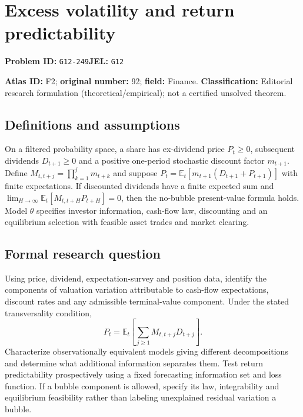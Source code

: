 \documentclass[11pt,a4paper]{article}
\begin{document}
\section*{Excess volatility and return predictability}
\textbf{Problem ID:} \texttt{G12-249}\quad \textbf{JEL:} \texttt{G12}\par
\label{problem:OP-0092}
\label{audited:ECON-037}
\label{atlas:prob:F2}

\noindent\textbf{Atlas ID:} F2; \textbf{original number:} 92; \textbf{field:} Finance. \textbf{Classification:} Editorial research formulation (theoretical/empirical); not a certified unsolved theorem.

\subsection*{Definitions and assumptions}
On a filtered probability space, a share has ex-dividend price $P_t\ge0$, subsequent dividends $D_{t+1}\ge0$ and a positive one-period stochastic discount factor $m_{t+1}$. Define $M_{t,t+j}=\prod_{k=1}^{j}m_{t+k}$ and suppose $P_t=\mathbb E_t[m_{t+1}(D_{t+1}+P_{t+1})]$ with finite expectations. If discounted dividends have a finite expected sum and $\lim_{H\to\infty}\mathbb E_t[M_{t,t+H}P_{t+H}]=0$, then the no-bubble present-value formula holds. Model $\theta$ specifies investor information, cash-flow law, discounting and an equilibrium selection with feasible asset trades and market clearing.

\subsection*{Formal research question}
Using price, dividend, expectation-survey and position data, identify the components of valuation variation attributable to cash-flow expectations, discount rates and any admissible terminal-value component. Under the stated transversality condition,
\[
 P_t=\mathbb E_t\!\left[\sum_{j\ge1}M_{t,t+j}D_{t+j}\right].
\]
Characterize observationally equivalent models giving different decompositions and determine what additional information separates them. Test return predictability prospectively using a fixed forecasting information set and loss function. If a bubble component is allowed, specify its law, integrability and equilibrium feasibility rather than labeling unexplained residual variation a bubble.
\end{document}
